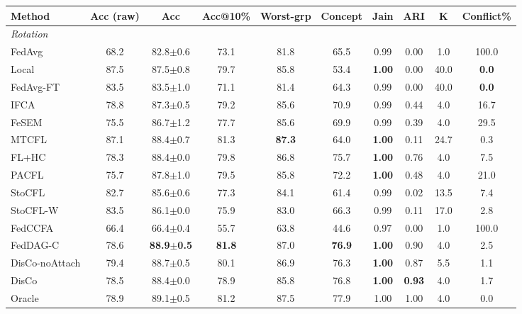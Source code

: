 \scriptsize
\setlength{\tabcolsep}{3.2pt}
\begin{tabular}{lccccccccc}
\toprule
Method & Acc (raw) & Acc & Acc@10\% & Worst-grp & Concept & Jain & ARI & K & Conflict\% \\
\midrule
\multicolumn{10}{l}{\textit{Rotation}}\\
FedAvg & 68.2 & 82.8$\pm$0.6 & 73.1 & 81.8 & 65.5 & 0.99 & 0.00 & 1.0 & 100.0 \\
Local & 87.5 & 87.5$\pm$0.8 & 79.7 & 85.8 & 53.4 & \textbf{1.00} & 0.00 & 40.0 & \textbf{0.0} \\
FedAvg-FT & 83.5 & 83.5$\pm$1.0 & 71.1 & 81.4 & 64.3 & 0.99 & 0.00 & 40.0 & \textbf{0.0} \\
IFCA & 78.8 & 87.3$\pm$0.5 & 79.2 & 85.6 & 70.9 & 0.99 & 0.44 & 4.0 & 16.7 \\
FeSEM & 75.5 & 86.7$\pm$1.2 & 77.7 & 85.6 & 69.9 & 0.99 & 0.39 & 4.0 & 29.5 \\
MTCFL & 87.1 & 88.4$\pm$0.7 & 81.3 & \textbf{87.3} & 64.0 & \textbf{1.00} & 0.11 & 24.7 & 0.3 \\
FL+HC & 78.3 & 88.4$\pm$0.0 & 79.8 & 86.8 & 75.7 & \textbf{1.00} & 0.76 & 4.0 & 7.5 \\
PACFL & 75.7 & 87.8$\pm$1.0 & 79.5 & 85.8 & 72.2 & \textbf{1.00} & 0.48 & 4.0 & 21.0 \\
StoCFL & 82.7 & 85.6$\pm$0.6 & 77.3 & 84.1 & 61.4 & 0.99 & 0.02 & 13.5 & 7.4 \\
StoCFL-W & 83.5 & 86.1$\pm$0.0 & 75.9 & 83.0 & 66.3 & 0.99 & 0.11 & 17.0 & 2.8 \\
FedCCFA & 66.4 & 66.4$\pm$0.4 & 55.7 & 63.8 & 44.6 & 0.97 & 0.00 & 1.0 & 100.0 \\
FedDAG-C & 78.6 & \textbf{88.9$\pm$0.5} & \textbf{81.8} & 87.0 & \textbf{76.9} & \textbf{1.00} & 0.90 & 4.0 & 2.5 \\
DisCo-noAttach & 79.4 & 88.7$\pm$0.5 & 80.1 & 86.9 & 76.3 & \textbf{1.00} & 0.87 & 5.5 & 1.1 \\
DisCo & 78.5 & 88.4$\pm$0.0 & 78.9 & 85.8 & 76.8 & \textbf{1.00} & \textbf{0.93} & 4.0 & 1.7 \\
Oracle & 78.9 & 89.1$\pm$0.5 & 81.2 & 87.5 & 77.9 & 1.00 & 1.00 & 4.0 & 0.0 \\
\bottomrule
\end{tabular}
